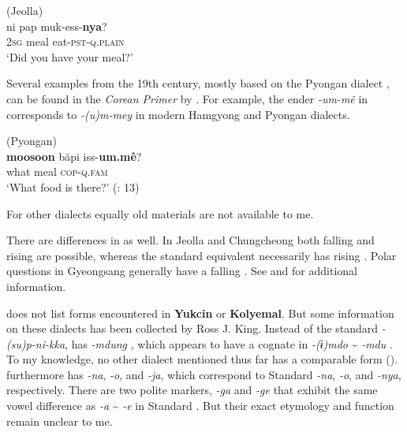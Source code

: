 \ea%
    \label{ex:kore:20}
     (Jeolla)\\
    \gll ni  pap  muk-ess-\textbf{{nya}}?\\
    2\textsc{sg}  meal  eat-\textsc{pst}-\textsc{q}.\textsc{plain}\\
    \glt ‘Did you have your meal?’ \citep[74]{Sohn1999}
    \z

\noindent Several examples from the 19th century, mostly based on the Pyongan dialect \citep[238]{King1987}, can be found in the \textit{Corean Primer} by \citet{Ross1877}. For example, the ender \textit{-um-mê} in  corresponds to \textit{-(u)m-mey} in modern Hamgyong and Pyongan dialects.

\ea%
    \label{ex:kore:21}
     (Pyongan)\\
    \gll \textbf{{moosoon}} băpi  iss-\textbf{{um.mê}}?\\
    what    meal  \textsc{cop}-\textsc{q}.\textsc{fam}\\
    \glt ‘What food is there?’ (\citealt{Ross1877}: 13)
    \z

\noindent For other dialects equally old materials are not available to me.

There are differences in  as well. In Jeolla and Chungcheong both falling and rising  are possible, whereas the standard  equivalent necessarily has rising . Polar questions in Gyeongsang generally have a falling . See \citet[66-76]{Sohn1999} and \citet{Jeon2015} for additional information.

 does not list forms encountered in \textbf{Yukcin} or \textbf{Kolyemal}. But some information on these dialects has been collected by Ross J. King. Instead of the standard  \textit{-(su)p-ni-kka},  has \textit{-mdung} \citep[238]{King1987}, which appears to have a cognate in  \textit{-(ɨ)mdo} {\textasciitilde} \textit{-mdu} \citep[262]{King1987}. To my knowledge, no other  dialect mentioned thus far has a comparable form ().  furthermore has \textit{-na}, \textit{-o}, and \textit{-ja}, which correspond to Standard  \textit{-na}, \textit{-o}, and \textit{-nya}, respectively. There are two polite markers, \textit{-ga} and \textit{-ge} that exhibit the same vowel difference as \textit{-a} {\textasciitilde} \textit{-e} in Standard . But their exact etymology and function remain unclear to me.

